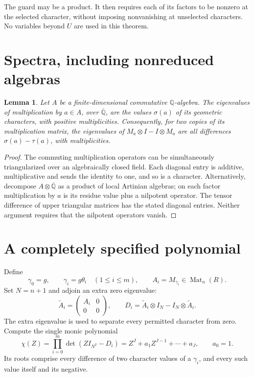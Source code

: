 \documentclass[11pt]{article}
\newtheorem{lemma}[theorem]{Lemma}
\newcommand{\Q}{\mathbb Q}\newcommand{\Z}{\mathbb Z}
\newcommand{\Mat}{\operatorname{Mat}}
\begin{document}
The guard may be a product. It then requires each of its factors to be
nonzero at the selected character, without imposing nonvanishing at
unselected characters. No variables beyond $U$ are used in this theorem.

\section{Spectra, including nonreduced algebras}

\begin{lemma}\label{spectrum}
Let $A$ be a finite-dimensional commutative $\Q$-algebra. The eigenvalues
of multiplication by $a\in A$, over $\overline{\Q}$, are the values
$\sigma(a)$ of its geometric characters, with positive multiplicities.
Consequently, for two copies of its multiplication matrix, the eigenvalues
of $M_a\otimes I-I\otimes M_a$ are all differences
$\sigma(a)-\tau(a)$, with multiplicities.
\end{lemma}
\begin{proof}
The commuting multiplication operators can be simultaneously triangularized
over an algebraically closed field. Each diagonal entry is additive,
multiplicative and sends the identity to one, and so is a character.
Alternatively, decompose $A\otimes\overline{\Q}$ as a product of local
Artinian algebras; on each factor multiplication by $a$ is its residue
value plus a nilpotent operator. The tensor difference of upper triangular
matrices has the stated diagonal entries. Neither argument requires that
the nilpotent operators vanish.
\end{proof}

\section{A completely specified polynomial}
Define
\[
 \gamma_0=g,\qquad \gamma_i=g\theta_i\quad(1\le i\le m),
 \qquad A_i=M_{\gamma_i}\in\Mat_n(R).
\]
Set $N=n+1$ and adjoin an extra zero eigenvalue:
\[
 \widetilde A_i=\begin{pmatrix}A_i&0\\0&0\end{pmatrix},\qquad
 D_i=\widetilde A_i\otimes I_N-I_N\otimes\widetilde A_i.
\]
The extra eigenvalue is used to separate every permitted character from
zero. Compute the single monic polynomial
\begin{equation}\label{differencepolynomial}
 \chi(Z)=\prod_{i=0}^{m}\det(ZI_{N^2}-D_i)
       =Z^J+a_1Z^{J-1}+\cdots+a_J,
 \qquad a_0=1.
\end{equation}
Its roots comprise every difference of two character values of a
$\gamma_i$, and every such value itself and its negative.
\end{document}
